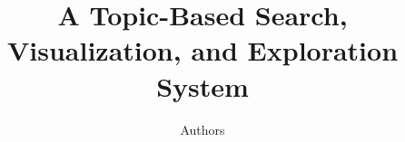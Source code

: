 \documentclass[letterpaper]{article}
\begin{document}
\title{A Topic-Based Search, Visualization, and Exploration System}
\author{Authors}
\maketitle














\end{document}
